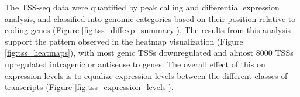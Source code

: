 The TSS-seq data were quantified by peak calling and differential expression analysis, and classified into genomic categories based on their position relative to coding genes (Figure \ref{fig:tss_diffexp_summary}).
The results from this analysis support the pattern observed in the heatmap visualization (Figure \ref{fig:tss_heatmaps}), with most genic TSSs downregulated and almost 8000 TSSs upregulated intragenic or antisense to genes.
The overall effect of this on expression levels is to equalize expression levels between the different classes of transcripts (Figure \ref{fig:tss_expression_levels}).

\newpage

\begingroup
\singlespacing

\endgroup
